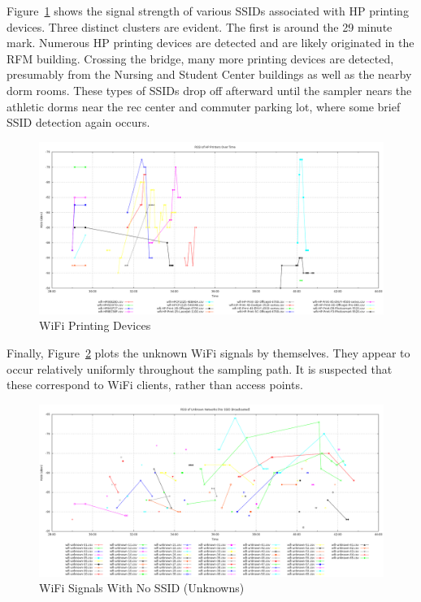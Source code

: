 \documentclass[journal,twocolumn]{IEEEtran}
\begin{document}
Figure~\ref{fig_wifi_5} shows the signal strength of various SSIDs associated 
with HP printing devices. Three distinct clusters are evident. The first is 
around the 29 minute mark. Numerous HP printing devices are detected and are 
likely originated in the RFM building. Crossing the bridge, many more printing 
devices are detected, presumably from the Nursing and Student Center buildings 
as well as the nearby dorm rooms. These types of SSIDs drop off afterward 
until the sampler nears the athletic dorms near the rec center and commuter 
parking lot, where some brief SSID detection again occurs.

\begin{figure}
\begin{center}
\includegraphics[scale=0.3]{wifi-data/005-printers.png}
\caption{WiFi Printing Devices}
\label{fig_wifi_5}
\end{center}
\end{figure}

Finally, Figure~\ref{fig_wifi_6} plots the unknown WiFi signals by themselves. 
They appear to occur relatively uniformly throughout the sampling path. It is 
suspected that these correspond to WiFi clients, rather than access points.

\begin{figure}
\begin{center}
\includegraphics[scale=0.3]{wifi-data/006-unknowns.png}
\caption{WiFi Signals With No SSID (Unknowns)}
\label{fig_wifi_6}
\end{center}
\end{figure}
\end{document}
